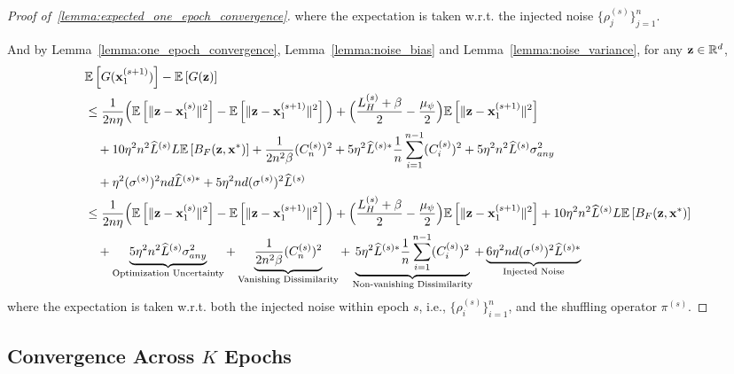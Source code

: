 \begin{proof}[Proof of~\ref{lemma:expected_one_epoch_convergence}]
    where the expectation is taken w.r.t. the injected noise $\{\rho_j^{(s)}\}_{j=1}^{n}$.

    And by Lemma~\ref{lemma:one_epoch_convergence},  Lemma~\ref{lemma:noise_bias} and Lemma~\ref{lemma:noise_variance}, for any ${\mathbf{z}}\in \mathbb{R}^d$,
    \begin{align}
        &\mathbb{E}\left[ G({\mathbf{x}}_1^{(s+1)})\right] - \mathbb{E}\left[ G({\mathbf{z}}) \right]\\
        \nonumber
        &\leq \frac{1}{2 n \eta}\Big( \mathbb{E}\left[\|{\mathbf{z}} - {\mathbf{x}}_1^{(s)}\|^2\right]  - \mathbb{E}\left[ \|{\mathbf{z}} - {\mathbf{x}}_1^{(s+1)}\|^2 \right] \Big)
        + \Big( \frac{L_H^{(s)} + \beta}{2} - \frac{\mu_{\psi}}{2} \Big) \mathbb{E}\left[\| {\mathbf{z}} - {\mathbf{x}}_1^{(s+1)}\|^2 \right]\\
        \nonumber
        &\quad  + 10\eta^2 n^2 \widehat{L}^{(s)} L \mathbb{E}\left[  B_F({\mathbf{z}}, {\mathbf{x}}^*)\right]
        + \frac{1}{2n^2 \beta}(C_n^{(s)})^2 
         + 5\eta^2 \widehat{L}^{(s)*} \frac{1}{n} \sum_{i=1}^{n-1}(C_i^{(s)})^2
            + 5 \eta^2 n^2 \widehat{L}^{(s)}\sigma_{any}^2 \\
        \nonumber
        &\quad + 
        \eta^2 (\sigma^{(s)})^2 nd \widehat{L}^{(s)*}
        + 5\eta^2 nd (\sigma^{(s)})^2 \widehat{L}^{(s)}\\
        &\leq  \frac{1}{2 n \eta}\Big( \mathbb{E}\left[\|{\mathbf{z}} - {\mathbf{x}}_1^{(s)}\|^2\right]  - \mathbb{E}\left[ \|{\mathbf{z}} - {\mathbf{x}}_1^{(s+1)}\|^2 \right] \Big)
        + \Big( \frac{L_H^{(s)} + \beta}{2} - \frac{\mu_{\psi}}{2} \Big) \mathbb{E}\left[\| {\mathbf{z}} - {\mathbf{x}}_1^{(s+1)}\|^2 \right]
        + 10\eta^2 n^2 \widehat{L}^{(s)} L \mathbb{E}\left[  B_F({\mathbf{z}}, {\mathbf{x}}^*)\right]\\
        \nonumber
        &\quad + \underbrace{
            5 \eta^2 n^2 \widehat{L}^{(s)}\sigma_{any}^2
        }_{\text{Optimization Uncertainty}}
        + \underbrace{
            \frac{1}{2n^2 \beta}(C_n^{(s)})^2 
        }_{\text{Vanishing Dissimilarity}}
         + \underbrace{
            5\eta^2 \widehat{L}^{(s)*} \frac{1}{n} \sum_{i=1}^{n-1}(C_i^{(s)})^2
        }_{\text{Non-vanishing Dissimilarity}}
         + \underbrace{
            6 \eta^2 nd (\sigma^{(s)})^2 \widehat{L}^{(s)*}
        }_{\text{Injected Noise}}
    \end{align}
    where the expectation is taken w.r.t. both the injected noise within epoch $s$, i.e., $\{\rho_i^{(s)}\}_{i=1}^{n}$, and the shuffling operator $\pi^{(s)}$.

    
\end{proof}




\subsection{Convergence Across $K$ Epochs}
\label{subsec:appendix_k_epoch_convergence}

